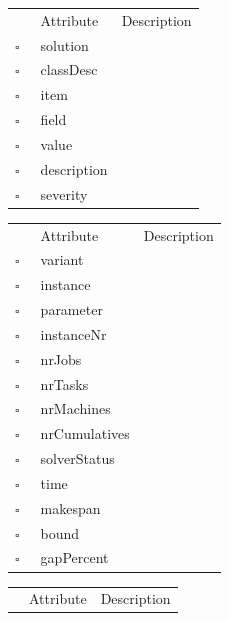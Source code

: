 \begin{table}
\caption{SolutionError  }

\begin{longtable}{llp{8cm}}
& Attribute & Description \\
$\square$\ & solution &  \\
$\square$\ & classDesc &  \\
$\square$\ & item &  \\
$\square$\ & field &  \\
$\square$\ & value &  \\
$\square$\ & description &  \\
$\square$\ & severity &  \\
\end{longtable}
\label{attr:SolutionError}
\end{table}

\clearpage
\begin{table}
\caption{SolutionSummary  }

\begin{longtable}{llp{8cm}}
& Attribute & Description \\
$\square$\ & variant &  \\
$\square$\ & instance &  \\
$\square$\ & parameter &  \\
$\square$\ & instanceNr &  \\
$\square$\ & nrJobs &  \\
$\square$\ & nrTasks &  \\
$\square$\ & nrMachines &  \\
$\square$\ & nrCumulatives &  \\
$\square$\ & solverStatus &  \\
$\square$\ & time &  \\
$\square$\ & makespan &  \\
$\square$\ & bound &  \\
$\square$\ & gapPercent &  \\
\end{longtable}
\label{attr:SolutionSummary}
\end{table}

\begin{table}
\caption{SolverProperty  }

\begin{longtable}{llp{8cm}}
& Attribute & Description \\
\end{longtable}
\label{attr:SolverProperty}
\end{table}

